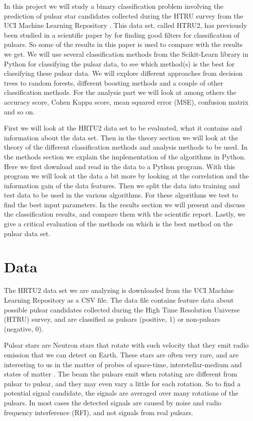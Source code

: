 \documentclass[12pt,a4paper,english]{article}
\begin{document}
In this project we will study a binary classification problem involving the prediction of pulsar star candidates collected during the HTRU survey from the UCI Machine Learning Repository \cite{UCI}. This data set, called HTRU2, has previously been studied in a scientific paper by \citet{pulsar_art} for finding good filters for classification of pulsars. So some of the results in this paper is used to compare with the results we get. We will use several classification methods from the Scikit-Learn library in Python for classifying the pulsar data, to see which method(s) is the best for classifying these pulsar data. We will explore different approaches from decision trees to random forests, different boosting methods and a couple of other classification methods. For the analysis part we will look at among others the accuracy score, Cohen Kappa score, mean squared error (MSE), confusion matrix and so on.

First we will look at the HRTU2 data set to be evaluated, what it contains and information about the data set. Then in the theory section we will look at the theory of the different classification methods and analysis methods to be used. In the methods section we explain the implementation of the algorithms in Python. Here we first download and read in the data to a Python program. With this program we will look at the data a bit more by looking at the correlation and the information gain
of the data features. Then we split the data into training and test data to be used in the various algorithms. For these algorithms we test to find the best input parameters. In the results section we will present and discuss the classification results, and compare them with the scientific report. Lastly, we give a critical evaluation of the methods on which is the best method on the pulsar data set.

\section{Data}
\label{sect:Data}
The HRTU2 data set we are analyzing is downloaded from the UCI Machine Learning Repository \cite{UCI} as a CSV file. The data file contains feature data about possible pulsar candidates collected during the High Time Resolution Universe (HTRU) survey, and are classified as pulsars (positive, 1) or non-pulsars (negative, 0). 

Pulsar stars are Neutron stars that rotate with such velocity that they emit radio emission that we can detect on Earth. These stars are often very rare, and are interesting to us in the matter of probes of space-time, interstellar-medium and states of matter \cite{UCI}. The beam the pulsars emit when rotating are different from pulsar to pulsar, and they may even vary a little for each rotation. So to find a potential signal candidate, the signals are averaged over many rotations of the pulsars. In most cases the detected signals are caused by noise and radio frequency interference (RFI), and not signals from real pulsars.
\end{document}
